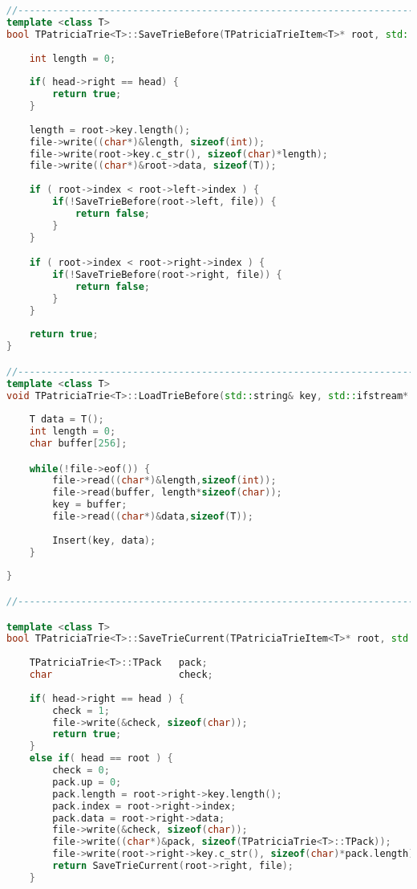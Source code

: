 \begin{lstlisting}[language=C++]
//----------------------------------------------------------------------------
template <class T>
bool TPatriciaTrie<T>::SaveTrieBefore(TPatriciaTrieItem<T>* root, std::ofstream* file) const {
    
    int length = 0;
    
    if( head->right == head) {
        return true;
    }
    
    length = root->key.length();
    file->write((char*)&length, sizeof(int));
    file->write(root->key.c_str(), sizeof(char)*length);
    file->write((char*)&root->data, sizeof(T));
    
    if ( root->index < root->left->index ) {
        if(!SaveTrieBefore(root->left, file)) {
            return false;
        }
    }

    if ( root->index < root->right->index ) {
        if(!SaveTrieBefore(root->right, file)) {
            return false;
        }
    }
    
    return true;
}

//----------------------------------------------------------------------------
template <class T>
void TPatriciaTrie<T>::LoadTrieBefore(std::string& key, std::ifstream* file) {
    
    T data = T();
    int length = 0;
    char buffer[256];

    while(!file->eof()) {
        file->read((char*)&length,sizeof(int));
        file->read(buffer, length*sizeof(char));
        key = buffer;
        file->read((char*)&data,sizeof(T));
        
        Insert(key, data);
    }
    
}

//----------------------------------------------------------------------------

template <class T>
bool TPatriciaTrie<T>::SaveTrieCurrent(TPatriciaTrieItem<T>* root, std::ofstream* file) const {
    
    TPatriciaTrie<T>::TPack   pack;
    char                      check;
    
    if( head->right == head ) {
        check = 1;
        file->write(&check, sizeof(char));
        return true;
    }
    else if( head == root ) {
        check = 0;
        pack.up = 0;
        pack.length = root->right->key.length();
        pack.index = root->right->index;
        pack.data = root->right->data;
        file->write(&check, sizeof(char));
        file->write((char*)&pack, sizeof(TPatriciaTrie<T>::TPack));
        file->write(root->right->key.c_str(), sizeof(char)*pack.length);
        return SaveTrieCurrent(root->right, file);
    }
    

\end{lstlisting}

